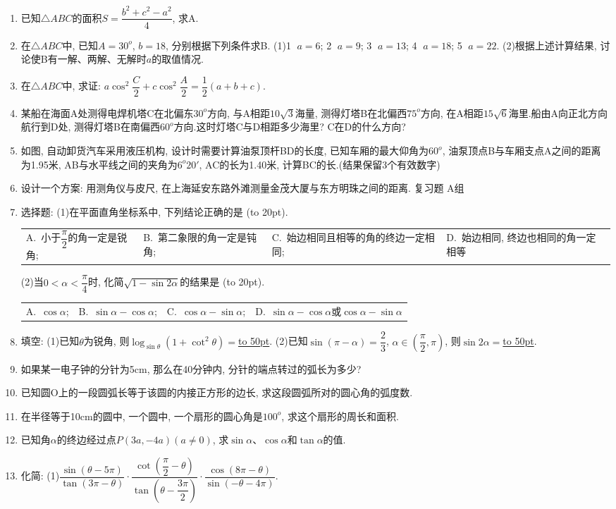 \documentclass[10pt,a4paper]{article}
\newcommand{\blank}[1]{\underline{\hbox to #1pt{}}}
\newcommand{\bracket}[1]{(\hbox to #1pt{})}
\newcommand{\fourch}[4]{\par\begin{tabular}{p{.23\textwidth}p{.23\textwidth}p{.23\textwidth}p{.23\textwidth}}
A.~#1 &B.~#2& C.~#3& D.~#4
\end{tabular}}
\begin{document}
\begin{enumerate}[1.]
\item 已知$\triangle ABC$的面积$S=\dfrac{b^2+c^2-a^2}4$, 求A.
\item 在$\triangle ABC$中, 已知$A=30^o$, $b=18$, 分别根据下列条件求B.
(1)\textcircled{1} $a=6$; \textcircled{2} $a=9$; \textcircled{3} $a=13$; \textcircled{4} $a=18$; \textcircled{5} $a=22$.
(2)根据上述计算结果, 讨论使B有一解、两解、无解时$a$的取值情况.
\item 在$\triangle ABC$中, 求证: $a\cos ^2\dfrac C2+c\cos ^2\dfrac A2=\dfrac 12(a+b+c)$.
\item 某船在海面A处测得电焊机塔C在北偏东$30^o$方向, 与A相距$10\sqrt 3$海量, 测得灯塔B在北偏西$75^o$方向, 在A相距$15\sqrt 6$海里.船由A向正北方向航行到D处, 测得灯塔B在南偏西$60^o$方向.这时灯塔C与D相距多少海里? C在D的什么方向?
\item 如图, 自动卸货汽车采用液压机构, 设计时需要计算油泵顶杆BD的长度, 已知车厢的最大仰角为$60^o$, 油泵顶点B与车厢支点A之间的距离为1.95米, AB与水平线之间的夹角为$6^o20'$, AC的长为1.40米, 计算BC的长.(结果保留3个有效数字)
\item 设计一个方案: 用测角仪与皮尺, 在上海延安东路外滩测量金茂大厦与东方明珠之间的距离.
复习题
A组
\item 选择题:
(1)在平面直角坐标系中, 下列结论正确的是							\bracket{20}.
\fourch{小于$\dfrac{\pi }2$的角一定是锐角;}{第二象限的角一定是钝角;}{始边相同且相等的角的终边一定相同;}{始边相同, 终边也相同的角一定相等}
(2)当$0<\alpha <\dfrac{\pi }4$时, 化简$\sqrt {1-\sin 2\alpha }$的结果是							\bracket{20}.
\fourch{$\cos \alpha$;}{$\sin \alpha -\cos \alpha$;}{$\cos \alpha -\sin \alpha$;}{$\sin \alpha -\cos \alpha$或$\cos \alpha -\sin \alpha$}
\item 填空:
(1)已知$\theta$为锐角, 则$\log _{\sin \theta }(1+\cot ^2\theta)=$\blank{50}.
(2)已知$\sin (\pi -\alpha)=\dfrac 23$, $\alpha \in (\dfrac{\pi }2,\pi)$, 则$\sin 2\alpha =$\blank{50}.
\item 如果某一电子钟的分针为5cm, 那么在40分钟内, 分针的端点转过的弧长为多少?
\item 已知圆O上的一段圆弧长等于该圆的内接正方形的边长, 求这段圆弧所对的圆心角的弧度数.
\item 在半径等于10cm的圆中, 一个圆中, 一个扇形的圆心角是$100^o$, 求这个扇形的周长和面积.
\item 已知角$\alpha$的终边经过点$P(3a,-4a)(a\ne 0)$, 求$\sin \alpha$、$\cos \alpha$和$\tan \alpha$的值.
\item 化简:
(1)$\dfrac{\sin (\theta -5\pi)}{\tan (3\pi -\theta)}\cdot \dfrac{\cot (\dfrac{\pi }2-\theta)}{\tan (\theta -\dfrac{3\pi }2)}\cdot \dfrac{\cos (8\pi -\theta)}{\sin (-\theta -4\pi)}$.

\end{enumerate}
\end{document}
